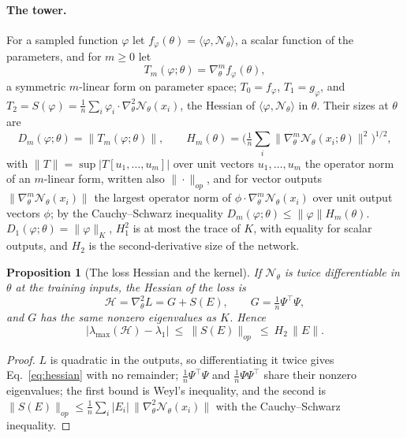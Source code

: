 \documentclass[11pt]{article}
\newtheorem{proposition}{Proposition}
\theoremstyle{definition}
\theoremstyle{remark}
\newcommand{\Net}{\mathcal{N}_\theta}    %
\newcommand{\ip}[2]{\langle #1,#2\rangle}
\newcommand{\Hess}{\mathcal{H}}          %
\begin{document}
\paragraph{The tower.}
For a sampled function $\varphi$ let $f_\varphi(\theta) = \ip{\varphi}{\Net}$, a scalar function of the parameters, and for $m\ge0$ let
\begin{equation}\label{eq:Tm}
T_m(\varphi;\theta) = \nabla^m_\theta f_\varphi(\theta),
\end{equation}
a symmetric $m$-linear form on parameter space; $T_0 = f_\varphi$, $T_1 = g_\varphi$, and $T_2 = S(\varphi) = \frac1n\sum_i\varphi_i\cdot\nabla^2_\theta\Net(x_i)$, the Hessian of $\ip{\varphi}{\Net}$ in $\theta$.
Their sizes at $\theta$ are
\begin{equation}\label{eq:Dm}
D_m(\varphi;\theta) = \|T_m(\varphi;\theta)\|,\qquad
H_m(\theta) = \Big(\tfrac1n\sum_i\|\nabla^m_\theta\Net(x_i;\theta)\|^2\Big)^{1/2},
\end{equation}
with $\|T\| = \sup|T[u_1,\dots,u_m]|$ over unit vectors $u_1,\dots,u_m$ the operator norm of an $m$-linear form, written also $\|\cdot\|_{op}$, and for vector outputs $\|\nabla^m_\theta\Net(x_i)\|$ the largest operator norm of $\phi\cdot\nabla^m_\theta\Net(x_i)$ over unit output vectors $\phi$; by the Cauchy--Schwarz inequality $D_m(\varphi;\theta)\le\|\varphi\|H_m(\theta)$.
$D_1(\varphi;\theta) = \|\varphi\|_K$, $H_1^2$ is at most the trace of $K$, with equality for scalar outputs, and $H_2$ is the second-derivative size of the network.

\begin{proposition}[The loss Hessian and the kernel]\label{prop:hessian}
If $\Net$ is twice differentiable in $\theta$ at the training inputs, the Hessian of the loss is
\begin{equation}\label{eq:hessian}
\Hess = \nabla^2_\theta L = G + S(E),\qquad G = \tfrac1n\Psi^\top\Psi,
\end{equation}
and $G$ has the same nonzero eigenvalues as $K$. Hence
\begin{equation}\label{eq:sharpness}
\big|\lambda_{\max}(\Hess) - \lambda_1\big|\ \le\ \|S(E)\|_{op}\ \le\ H_2\,\|E\| .
\end{equation}
\end{proposition}

\begin{proof}
$L$ is quadratic in the outputs, so differentiating it twice gives Eq.~\eqref{eq:hessian} with no remainder; $\frac1n\Psi^\top\Psi$ and $\frac1n\Psi\Psi^\top$ share their nonzero eigenvalues; the first bound is Weyl's inequality, and the second is $\|S(E)\|_{op}\le\frac1n\sum_i|E_i|\,\|\nabla^2_\theta\Net(x_i)\|$ with the Cauchy--Schwarz inequality.
\end{proof}
\end{document}
